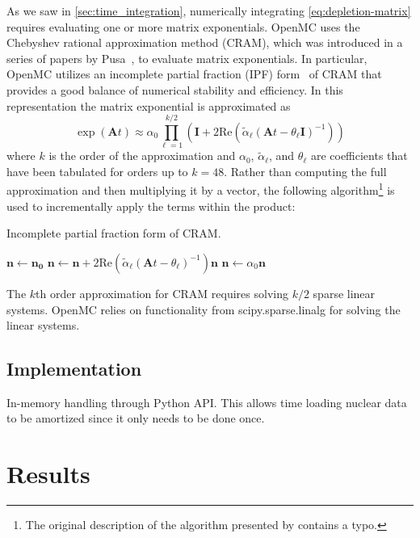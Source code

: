 \documentclass[3p,authoryear]{elsarticle}
\newcommand{\vect}[1]{\mathbf{#1}} %
\begin{document}
As we saw in \cref{sec:time_integration}, numerically integrating
\cref{eq:depletion-matrix} requires evaluating one or more matrix exponentials.
OpenMC uses the Chebyshev rational approximation method (CRAM), which was
introduced in a series of papers by Pusa~\citep{pusa2010nse,pusa2011nse}, to
evaluate matrix exponentials. In particular, OpenMC utilizes an incomplete
partial fraction (IPF) form~\citep{pusa2016nse} of CRAM that provides a good
balance of numerical stability and efficiency. In this representation the matrix
exponential is approximated as
\begin{equation}
    \exp(\vect{A}t) \approx \alpha_0 \prod\limits_{\ell=1}^{k/2} \left (
    \vect{I} + 2 \text{Re} \left ( \widetilde{\alpha}_\ell \left (\vect{A}t
    - \theta_\ell \vect{I} \right )^{-1} \right ) \right )
\end{equation}
where $k$ is the order of the approximation and $\alpha_0$,
$\widetilde{\alpha}_\ell$, and $\theta_\ell$ are coefficients that have been
tabulated for orders up to $k=48$. Rather than computing the full approximation
and then multiplying it by a vector, the following algorithm\footnote{The
original description of the algorithm presented by \citet{pusa2016nse} contains
a typo.} is used to incrementally apply the terms within the product:
\begin{algorithm}[H]
  \caption{Incomplete partial fraction form of CRAM.}
  \label{alg:cram}
  \begin{algorithmic}[1]
    \State $\vect{n} \gets \vect{n_0}$
      \State $\vect{n} \gets \vect{n} + 2\text{Re}(\widetilde{\alpha}_\ell
        (\vect{A}t - \theta_\ell)^{-1})\vect{n}$
    \EndFor
    \State $\vect{n} \gets \alpha_0 \vect{n}$
  \end{algorithmic}
\end{algorithm}
The $k$th order approximation for CRAM requires solving $k/2$ sparse linear
systems. OpenMC relies on functionality from scipy.sparse.linalg for solving the
linear systems.

\subsection{Implementation}

In-memory handling through Python API. This allows time loading nuclear data to
be amortized since it only needs to be done once.

\section{Results}
\label{sec:results}
\end{document}
